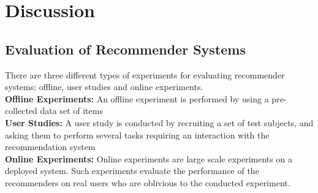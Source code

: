 \documentclass{llncs}
\begin{document}

\section{Discussion}
\label{sec:discussion}
\subsection{Evaluation of Recommender Systems}
There are three different types of experiments for evaluating recommender systems; offline, user studies and online experiments.\\
\textbf{Offline Experiments:}
An offline experiment is performed by using a pre-collected data set of items\\
\textbf{User Studies:}
A user study is conducted by recruiting a set of test subjects, and asking them to perform several tasks requiring an interaction with the recommendation system \\
\textbf{Online Experiments:}
Online experiments are large scale experiments on a deployed system. Such experiments evaluate the performance of the recommenders on real users who are oblivious to the conducted experiment.
\end{document}
